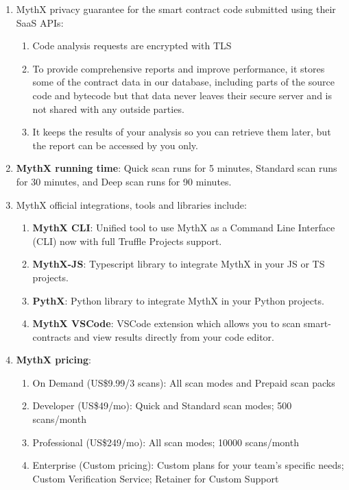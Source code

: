\begin{enumerate}
\item MythX privacy guarantee for the smart contract code submitted using their SaaS APIs:
	\begin{enumerate}
	\item Code analysis requests are encrypted with TLS
	\item To provide comprehensive reports and improve performance, it stores some of the contract data in our database, including parts of the source code and bytecode but that data never leaves their secure server and is not shared with any outside parties.
	\item It keeps the results of your analysis so you can retrieve them later, but the report can be accessed by you only.
	\end{enumerate}

\item\textbf{MythX running time}: Quick scan runs for 5 minutes, Standard scan runs for 30 minutes, and Deep scan runs for 90 minutes.

\item MythX official integrations, tools and libraries include:
	\begin{enumerate}
	\item\textbf{MythX CLI}: Unified tool to use MythX as a Command Line Interface (CLI) now with full Truffle Projects support.
	\item\textbf{MythX-JS}: Typescript library to integrate MythX in your JS or TS projects.
	\item\textbf{PythX}: Python library to integrate MythX in your Python projects.
	\item\textbf{MythX VSCode}: VSCode extension which allows you to scan smart-contracts and view results directly from your code editor.
	\end{enumerate}

\item\textbf{MythX pricing}:
	\begin{enumerate}
	\item On Demand (US\$9.99/3 scans): All scan modes and Prepaid scan packs
	\item Developer (US\$49/mo): Quick and Standard scan modes; 500 scans/month
	\item Professional (US\$249/mo): All scan modes; 10000 scans/month
	\item Enterprise (Custom pricing): Custom plans for your team's specific needs; Custom Verification Service; Retainer for Custom Support
	\end{enumerate}


\end{enumerate}
